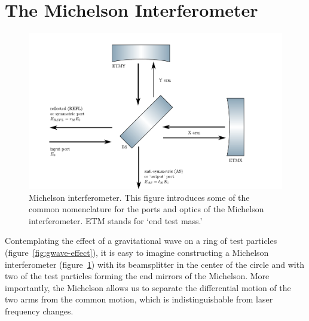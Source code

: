 \section{The Michelson Interferometer}
\begin{figure}
\centering\includegraphics{figures/michelson.pdf}
\caption[Michelson interferometer]{\label{fig:michelson}Michelson
  interferometer.  This figure introduces some of the common
  nomenclature for the ports and optics of the Michelson
  interferometer.  ETM stands for `end test mass.'}
\end{figure}

Contemplating the effect of a gravitational wave on a ring of test
particles (figure~\ref{fig:gwave-effect}), it is easy to imagine
constructing a Michelson interferometer (figure~\ref{fig:michelson})
with its beamsplitter in the center of the circle and with two of the
test particles forming the end mirrors of the Michelson.  More
importantly, the Michelson allows us to separate the differential
motion of the two arms from the common motion, which is
indistinguishable from laser frequency changes.

